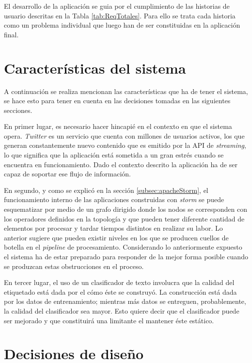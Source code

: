 El desarrollo de la aplicación se guia por el cumplimiento de las historias de usuario descritas en la Tabla \ref{tab:ReqTotales}. Para ello se trata cada historia como un problema individual que luego han de ser constituidas en la aplicación final.

\section{Características del sistema}
\label{sec:caracteristicasSistema}

A continuación se realiza mencionan las características que ha de tener el sistema, se hace esto para tener en cuenta en las decisiones tomadas en las siguientes secciones.

En primer lugar, es necesario hacer hincapié en el contexto en que el sistema opera. \textit{Twitter} es un servicio que cuenta con millones de usuarios activos, los que generan constantemente nuevo contenido que es emitido por la API de \textit{streaming}, lo que significa que la aplicación está sometida a un gran estrés cuando se encuentra en funcionamiento. Dado el contexto descrito la aplicación ha de ser capaz de soportar ese flujo de información.

En segundo, y como se explicó en la sección \ref{subsec:apacheStorm}, el funcionamiento interno de las aplicaciones construidas con \textit{storm} se puede esquematizar por medio de un grafo dirigido donde los nodos se corresponden con los operadores definidos en la topología y que pueden tener diferente cantidad de elementos por procesar y tardar tiempos distintos en realizar su labor. Lo anterior sugiere que pueden existir niveles en los que se producen cuellos de botella en el \textit{pipeline} de procesamiento. Considerando lo anteriormente expuesto el sistema ha de estar preparado para responder de la mejor forma posible cuando se produzcan estas obstrucciones en el proceso.

En tercer lugar, el uso de un clasificador de texto involucra que la calidad del etiquetado está dada por el cómo éste se construyó. La construcción está dada por los datos de entrenamiento; mientras más datos se entreguen, probablemente, la calidad del clasificador sea mayor. Esto quiere decir que el clasificador puede ser mejorado y que constituirá una limitante el mantener éste estático.

\section{Decisiones de diseño}
\label{sec:decDiseno}

